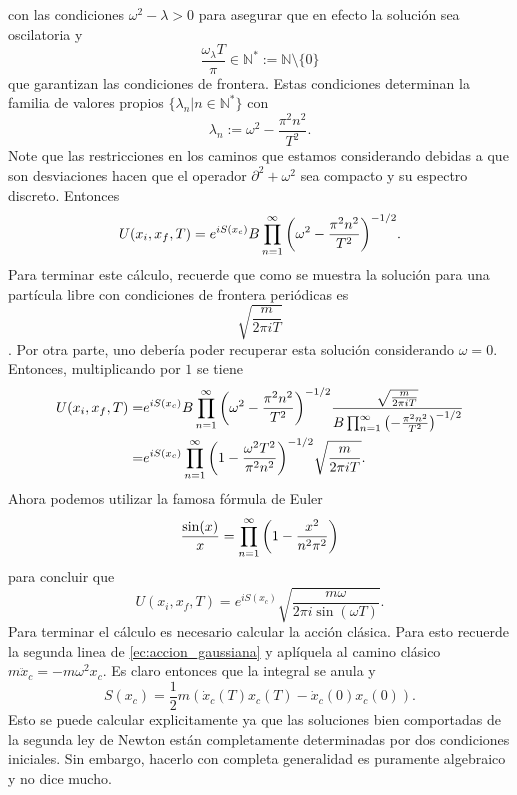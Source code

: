 \documentclass{article}
\begin{document}
con las condiciones $\omega^2-\lambda>0$ para asegurar que en efecto la solución sea oscilatoria y 
\begin{equation}
\frac{\omega_\lambda T}{\pi}\in\mathbb{N}^*:=\mathbb{N}\setminus\{0\}
\end{equation}
que garantizan las condiciones de frontera. Estas condiciones determinan la familia de valores propios $\{\lambda_n|n\in\mathbb{N}^*\}$ con
\begin{equation}
\lambda_n:=\omega^2-\frac{\pi^2n^2}{T^2}.
\end{equation}
Note que las restricciones en los caminos que estamos considerando debidas a que son desviaciones hacen que el operador $\partial^2+\omega^2$ sea compacto y su espectro discreto. Entonces
\begin{equation}
U(x_i,x_f,T)=e^{iS(x_c)}B\prod_{n=1}^\infty\qty(\omega^2-\frac{\pi^2n^2}{T^2})^{-1/2}.
\end{equation}
Para terminar este cálculo, recuerde que como se muestra \cite{MacKenzie2000} la solución para una partícula libre con condiciones de frontera periódicas es
\begin{equation}
\sqrt{\frac{m}{2\pi i T}}
\end{equation}.
Por otra parte, uno debería poder recuperar esta solución considerando $\omega=0$. Entonces, multiplicando por $1$ se tiene
\begin{align}
\begin{split}
U(x_i,x_f,T)=&e^{iS(x_c)}B\prod_{n=1}^\infty\qty(\omega^2-\frac{\pi^2n^2}{T^2})^{-1/2}\frac{\sqrt{\frac{m}{2\pi i T}}}{B\prod_{n=1}^\infty\qty(-\frac{\pi^2n^2}{T^2})^{-1/2}}\\
=&e^{iS(x_c)}\prod_{n=1}^\infty\qty(1-\frac{\omega^2T^2}{\pi^2n^2})^{-1/2}\sqrt{\frac{m}{2\pi i T}}.
\end{split}
\end{align}
Ahora podemos utilizar la famosa fórmula de Euler
\begin{equation}
\frac{\sin(x)}{x}=\prod_{n=1}^\infty\qty(1-\frac{x^2}{n^2\pi^2})
\end{equation}
para concluir que
\begin{equation}
U(x_i,x_f,T)=e^{iS(x_c)}\sqrt{\frac{m\omega}{2\pi i\sin(\omega T)}}.
\end{equation}
Para terminar el cálculo es necesario calcular la acción clásica. Para esto recuerde la segunda linea de \eqref{ec:accion_gaussiana} y aplíquela al camino clásico $m\ddot{x}_c=-m\omega^2x_c$. Es claro entonces que la integral se anula y
\begin{equation}
S(x_c)=\frac{1}{2}m(\dot{x}_c(T)x_c(T)-\dot{x}_c(0)x_c(0)).
\end{equation}
Esto se puede calcular explicitamente ya que las soluciones bien comportadas de la segunda ley de Newton están completamente determinadas por dos condiciones iniciales. Sin embargo, hacerlo con completa generalidad es puramente algebraico y no dice mucho.
\end{document}
